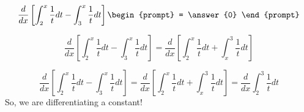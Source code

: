 \documentclass{ximera}
\author{Steven Gubkin\and Nela Lakos}
\begin{document}
\begin{exercise}

\[
\frac{d}{dx} \left[ \int_2^{x} \frac{1}{t} dt - \int_3^x \frac{1}{t} dt  \right] \begin{prompt} = \answer{0} \end{prompt}
\]
\begin{hint}
\[
\frac{d}{dx} \left[ \int_2^{x} \frac{1}{t} dt - \int_3^x \frac{1}{t} dt\right]=\frac{d}{dx} \left[ \int_2^{x} \frac{1}{t} dt + \int_x^3 \frac{1}{t} dt\right]
\]
\end{hint}
\begin{hint}
\[
\frac{d}{dx} \left[ \int_2^{x} \frac{1}{t} dt - \int_3^x \frac{1}{t} dt\right]=\frac{d}{dx} \left[ \int_2^{x} \frac{1}{t} dt + \int_x^3 \frac{1}{t} dt\right]=\frac{d}{dx}  \int_2^{3} \frac{1}{t} dt 
\]
So, we are differentiating a constant!
\end{hint}
\end{exercise}
\end{document}
